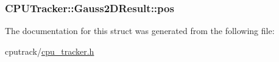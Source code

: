 \subsubsection[{\texorpdfstring{pos}{pos}}]{ C\+P\+U\+Tracker\+::\+Gauss2\+D\+Result\+::pos}\hypertarget{struct_c_p_u_tracker_1_1_gauss2_d_result_a7b4664668842daa04882ca2dd1d91fce}{}\label{struct_c_p_u_tracker_1_1_gauss2_d_result_a7b4664668842daa04882ca2dd1d91fce}


The documentation for this struct was generated from the following file\+:\begin{DoxyCompactItemize}
\item 
cputrack/\hyperlink{cpu__tracker_8h}{cpu\+\_\+tracker.\+h}\end{DoxyCompactItemize}
